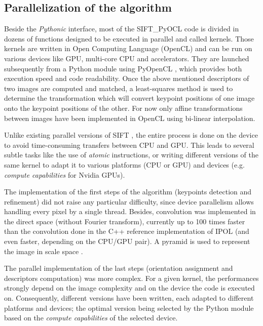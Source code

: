 \documentclass[preprint]{iucr}
\begin{document}
\subsection{Parallelization of the algorithm}
Beside the \emph{Pythonic} interface, most of the
SIFT\_PyOCL code is divided in dozens of functions designed to be
executed in parallel and called kernels. Those kernels are written in Open
Computing Language (OpenCL) \cite{opencl} and  can be run on various
devices like GPU, multi-core CPU and accelerators.
They are launched subsequently from a Python module using PyOpenCL
\cite{pyopencl}, which provides both execution speed and code readability.
Once the above mentioned descriptors of two images are computed and matched, a
least-squares method is used to determine the transformation which will convert
keypoint positions of one image onto the keypoint positions of the other. For
now only affine transformations between images have been implemented in OpenCL
using bi-linear interpolation.

Unlike existing parallel versions of SIFT \cite{lu,rister,vasilyev}, the entire
process is done on the device to avoid time-consuming transfers between CPU and
GPU.
This leads to several subtle tasks like the use of \emph{atomic} instructions,
or writing different versions of the same kernel to adapt it to various
platforms (CPU or GPU) and devices (e.g. \emph{compute capabilities} for
Nvidia GPUs).

The implementation of the first steps of the algorithm (keypoints detection and
refinement) did not raise any particular difficulty, since device parallelism
allows handling every pixel by a single thread.
Besides, convolution was implemented in the direct space (without Fourier
transform), currently up to 100 times faster than the convolution done in
the C++ reference implementation of IPOL \cite{ASIFT}
(and even faster, depending on the CPU/GPU pair).
A pyramid is used to represent the image in scale space \cite{Lowe04}.

The parallel implementation of the last steps (orientation assignment and
descriptors computation) was more complex.
For a given kernel, the performances strongly depend on the image
complexity and on the device the code is executed on.
Consequently, different versions have been written, each adapted to
different platforms and
devices; the optimal version being selected by the
Python module based on the \emph{compute capabilities} of the selected device.
\end{document}
